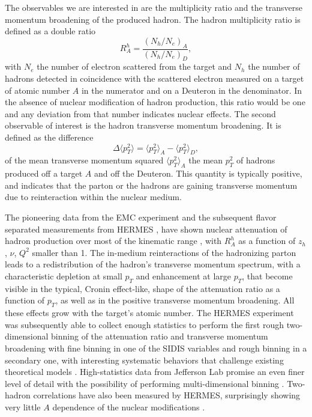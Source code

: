 The observables we are interested in are the multiplicity ratio and the 
transverse momentum broadening of the produced hadron. The hadron multiplicity 
ratio is defined as a double ratio
\begin{equation}
R^h_A = \frac{\left({N_h/N_e}\right)_A }{ \left({N_h/N_{e}}\right)_{D}},
\end{equation}
with $N_e$ the number of electron scattered from the target and $N_h$ the 
number of hadrons detected in coincidence with the scattered electron measured 
on a target of atomic number $A$ in the numerator and on a Deuteron in the 
denominator. In the absence of nuclear modification of hadron production, this 
ratio would be one and any deviation from that number indicates nuclear effects.
%
The second observable of interest is the hadron transverse momentum broadening. 
It is defined as the difference
\begin{equation}
\Delta \langle p_T^2 \rangle = \langle p_T^2 \rangle_A - \langle p_T^2 \rangle_{D},
\end{equation}
of the mean transverse momentum squared $\langle p_T^2 \rangle_A$ the mean 
$p_T^2$ of hadrons produced off a target $A$ and off the Deuteron. This 
quantity is typically positive, and indicates that the parton or the hadrons 
are gaining transverse momentum due to reinteraction within the nuclear medium.

The pioneering data from the EMC experiment \cite{Arvidson:1984fz,Ashman:1991cx} 
and the subsequent flavor separated measurements from HERMES 
\cite{Airapetian:2003mi,Airapetian:2007vu}, have shown nuclear attenuation of 
hadron production over most of the kinematic range \cite{Ashman:1991cx,%
Airapetian:2003mi,Airapetian:2007vu}, with $R_A^h$ as a function of $z_h$, 
$\nu$, $Q^2$ smaller than 1. The in-medium reinteractions of the hadronizing 
parton leads to a redistribution of the hadron's transverse momentum spectrum, 
with a characteristic depletion at small $p_T$ and enhancement at large $p_T$, 
that become visible in the typical, Cronin effect-like, shape of the 
attenuation ratio as a function of $p_T$, as well as in the positive transverse 
momentum broadening. All these effects grow with the target's atomic number.
The HERMES experiment was subsequently able to collect enough statistics to 
perform the first rough two-dimensional binning of the attenuation ratio and 
transverse momentum broadening with fine binning in one of the SIDIS variables 
and rough binning in a secondary one, with interesting systematic behaviors 
that challenge existing theoretical models \cite{Airapetian:2011jp}. 
High-statistics data from Jefferson Lab promise an even finer level of detail 
with the possibility of performing multi-dimensional binning 
\cite{Daniel:2011nq,Brooks:2009xg}. Two-hadron correlations have also been 
measured by HERMES, surprisingly showing very little $A$ dependence of the 
nuclear modifications \cite{Airapetian:2005yh}.

